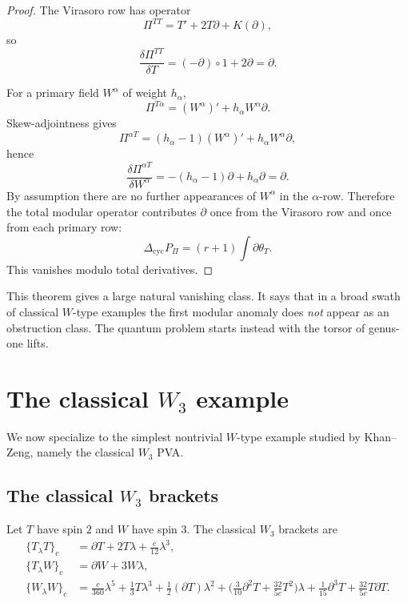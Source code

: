 \begin{proof}
The Virasoro row has operator
\[
\Pi^{TT}=T'+2T\partial+K(\partial),
\]
so
\[
\frac{\delta \Pi^{TT}}{\delta T}=(-\partial)\circ 1 + 2\partial=\partial.
\]

For a primary field $W^\alpha$ of weight $h_\alpha$,
\[
\Pi^{T\alpha}=(W^\alpha)'+h_\alpha W^\alpha\partial.
\]
Skew-adjointness gives
\[
\Pi^{\alpha T}=(h_\alpha-1)(W^\alpha)'+h_\alpha W^\alpha\partial,
\]
hence
\[
\frac{\delta \Pi^{\alpha T}}{\delta W^\alpha}
=-(h_\alpha-1)\partial+h_\alpha\partial=\partial.
\]
By assumption there are no further appearances of $W^\alpha$ in the $\alpha$-row. Therefore
the total modular operator contributes $\partial$ once from the Virasoro row and once from
each primary row:
\[
\Delta_{\mathrm{cyc}}P_\Pi=(r+1)\int \partial \theta_T.
\]
This vanishes modulo total derivatives.
\end{proof}

\begin{remark}
This theorem gives a large natural vanishing class. It says that in a broad swath of
classical $W$-type examples the first modular anomaly does \emph{not} appear as an
obstruction class. The quantum problem starts instead with the torsor of genus-one lifts.
\end{remark}

\section{The classical $W_3$ example}

We now specialize to the simplest nontrivial $W$-type example studied by Khan--Zeng,
namely the classical $W_3$ PVA.

\subsection{The classical $W_3$ brackets}

Let $T$ have spin $2$ and $W$ have spin $3$. The classical $W_3$ brackets are
\cite{KZ25}
\begin{align}
\{T_\lambda T\}_c
&=
\partial T+2T\lambda+\frac{c}{12}\lambda^3,
\\[4pt]
\{T_\lambda W\}_c
&=
\partial W+3W\lambda,
\\[4pt]
\{W_\lambda W\}_c
&=
\frac{c}{360}\lambda^5
+\frac13 T\lambda^3
+\frac12(\partial T)\lambda^2
+\Big(\frac3{10}\partial^2T+\frac{32}{5c}T^2\Big)\lambda
+\frac1{15}\partial^3T
+\frac{32}{5c}T\partial T.
\end{align}

